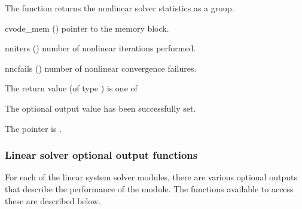 {
  The function  returns the
  {\cvode} nonlinear solver statistics as a group.
}
{
  \begin{args}
  \item[cvode\_mem] ()
    pointer to the {\cvode} memory block.
  \item[nniters] ()
    number of nonlinear iterations performed.
  \item[nncfails] ()
    number of nonlinear convergence failures.
  \end{args}
}
{
  The return value  (of type ) is one of
  \begin{args}
  \item[\Id{CV\_SUCCESS}] 
    The optional output value has been successfully set.
  \item[\Id{CV\_MEM\_NULL}]
    The  pointer is .
  \end{args}
}
{}


\subsubsection{Linear solver optional output functions}\label{sss:optout_linsol}

For each of the linear system solver modules, there are various optional 
outputs that describe the performance of the module. The functions available 
to access these are described below.

